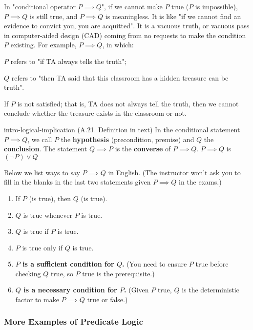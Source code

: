 \documentclass[../src/handouts/main.tex]{subfiles}
\begin{document}
In "conditional operator $P \implies Q$", if we cannot make $P$ true ($P$ is impossible), $P \implies Q$ is still true, and $P \implies Q$ is meaningless. It is like "if we cannot find an evidence to convict you, you are acquitted". It is a vacuous truth, or vacuous pass in computer-aided design (CAD) coming from no requests to make the condition $P$ existing. For example, $P \implies Q$, in which:
\begin{enumerate*}
  \item $P$ refers to "if TA always tells the truth";
  \item $Q$ refers to "then TA said that this classroom has a hidden treasure can be truth".
\end{enumerate*}
If $P$ is not satisfied; that is, TA does not always tell the truth, then we cannot conclude whether the treasure exists in the classroom or not.

\begin{definition}{}{intro-logical-implication}
  (A.21. Definition in text) In the conditional statement $P \implies Q$, we call $P$ the \textbf{hypothesis} (precondition, premise) and $Q$ the \textbf{conclusion}. The statement $Q \implies P$ is the \textbf{converse} of $P \implies Q$. $P \implies Q$ is $(\neg P) \lor Q$

  Below we list ways to say $P \implies Q$ in English. (The instructor won't ask you to fill in the blanks in the last two statements given $P \implies Q$ in the exams.)
  \begin{enumerate}
    \item If $P$ (is true), then $Q$ (is true).
    \item $Q$ is true whenever $P$ is true.
    \item $Q$ is true if $P$ is true.
    \item $P$ is true only if $Q$ is true.
    \item \textbf{$P$ is a sufficient condition for $Q$.} (You need to ensure $P$ true before checking $Q$ true, so $P$ true is the prerequisite.)
    \item \textbf{$Q$ is a necessary condition for $P$.} (Given $P$ true, $Q$ is the deterministic factor to make $P \implies Q$ true or false.)
  \end{enumerate}
\end{definition}

\subsubsection{More Examples of Predicate Logic}
\end{document}
